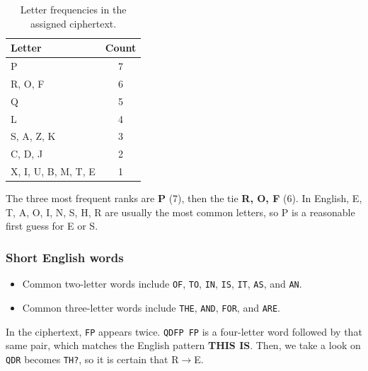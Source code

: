                 \begin{table}[h]
                    \centering
                    \begin{tabular}{lc}
                        \toprule
                        Letter & Count \\
                        \midrule
                        P & 7 \\
                        R, O, F & 6 \\
                        Q & 5 \\
                        L & 4 \\
                        S, A, Z, K & 3 \\
                        C, D, J & 2 \\
                        X, I, U, B, M, T, E & 1 \\
                        \bottomrule
                    \end{tabular}
                    \caption{Letter frequencies in the assigned ciphertext.}
                    \label{tab:freq}
                \end{table}

                The three most frequent ranks are \textbf{P} (7), then the tie \textbf{R, O, F} (6).
                In English, E, T, A, O, I, N, S, H, R are usually the most common letters, so P is a
                reasonable first guess for E or S.

            \subsubsection{Short English words}

                \begin{itemize}
                    \item Common two-letter words include \texttt{OF}, \texttt{TO}, \texttt{IN}, \texttt{IS},
                    \texttt{IT}, \texttt{AS}, and \texttt{AN}.
                    \item Common three-letter words include \texttt{THE}, \texttt{AND}, \texttt{FOR}, and \texttt{ARE}.
                \end{itemize}

                In the ciphertext, \texttt{FP} appears twice. \texttt{QDFP FP} is a four-letter
                word followed by that same pair, which matches the English pattern \textbf{THIS IS}.
                Then, we take a look on \texttt{QDR} becomes \texttt{TH?}, so it is certain that R$\rightarrow$E.

